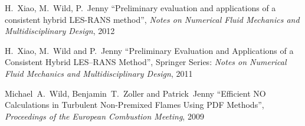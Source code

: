 \documentclass[line,11pt,a4paper]{../resume}
\begin{document}
\begin{resume}
\vspace{-3mm}
H.~Xiao, M.~Wild, P.~Jenny
``Preliminary evaluation and applications of a consistent hybrid LES-RANS
method'', \textsl{Notes on Numerical Fluid Mechanics and Multidisciplinary
Design}, 2012

\vspace{-3mm}
H.~Xiao, M.~Wild and P.~Jenny ``Preliminary Evaluation and
Applications of a Consistent Hybrid LES--RANS Method'', Springer Series:
\textsl{Notes on Numerical Fluid Mechanics and Multidisciplinary Design}, 2011

\vspace{-3mm}
Michael~A.~Wild, Benjamin~T.~Zoller and Patrick~Jenny
``Efficient NO Calculations in Turbulent Non-Premixed Flames Using
PDF Methods'', \textsl{Proceedings of the European Combustion Meeting}, 2009


\end{resume}
\end{document}
